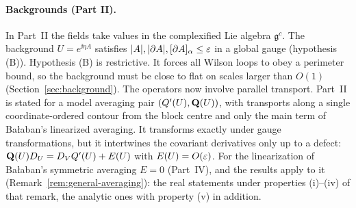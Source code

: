 \paragraph{Backgrounds (Part II).} In Part~II the fields take values in the complexified Lie algebra $\mathfrak g^c$. The background $U=e^{\ii\eta A}$ satisfies $|A|,|\partial A|,[\partial A]_\alpha\le\varepsilon$ in a global gauge (hypothesis (B)). Hypothesis (B) is restrictive. It forces all Wilson loops to obey a perimeter bound, so the background must be close to flat on scales larger than $O(1)$ (Section~\ref{sec:background}). The operators now involve parallel transport. Part~II is stated for a model averaging pair $(Q'(U),\mathbf Q(U))$, with transports along a single coordinate-ordered contour from the block centre and only the main term of Ba\l aban's linearized averaging. It transforms exactly under gauge transformations, but it intertwines the covariant derivatives only up to a defect: $\mathbf Q(U)D_U=D_VQ'(U)+E(U)$ with $E(U)=O(\varepsilon)$. For the linearization of Ba\l aban's symmetric averaging $E=0$ (Part~IV), and the results apply to it (Remark~\ref{rem:general-averaging}): the real statements under properties (i)--(iv) of that remark, the analytic ones with property (v) in addition.

